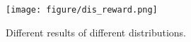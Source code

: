 \begin{figure}[t]
\centerline{\texttt{[image: figure/dis\_reward.png]}}
\caption{Different results of different distributions. }
\label{different result of different distribution}
\end{figure}


	

